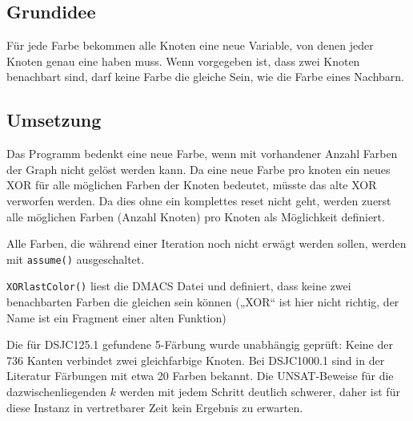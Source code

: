 \documentclass[11pt, a4paper]{article}
\begin{document}
\subsection*{Grundidee}

Für jede Farbe bekommen alle Knoten eine neue Variable, von denen jeder Knoten genau eine haben muss. Wenn vorgegeben ist, dass zwei Knoten benachbart sind, darf keine Farbe die gleiche Sein, wie die Farbe eines Nachbarn.

\subsection*{Umsetzung}

Das Programm bedenkt eine neue Farbe, wenn mit vorhandener Anzahl Farben der Graph nicht gelöst werden kann. Da eine neue Farbe pro knoten ein neues XOR für alle möglichen Farben der Knoten bedeutet, müsste das alte XOR verworfen werden. Da dies ohne ein komplettes reset nicht geht, werden zuerst alle möglichen Farben (Anzahl Knoten) pro Knoten als Möglichkeit definiert.

Alle Farben, die während einer Iteration noch nicht erwägt werden sollen, werden mit \texttt{assume()} ausgeschaltet.

\texttt{XORlastColor()} liest die DMACS Datei und definiert, dass keine zwei benachbarten Farben die gleichen sein können („XOR“ ist hier nicht richtig, der Name ist ein Fragment einer alten Funktion)

Die für DSJC125.1 gefundene 5-Färbung wurde unabhängig geprüft: Keine der 736 Kanten verbindet zwei gleichfarbige Knoten. Bei DSJC1000.1 sind in der Literatur Färbungen mit etwa 20 Farben bekannt. Die UNSAT-Beweise für die dazwischenliegenden $k$ werden mit jedem Schritt deutlich schwerer, daher ist für diese Instanz in vertretbarer Zeit kein Ergebnis zu erwarten.
\end{document}
